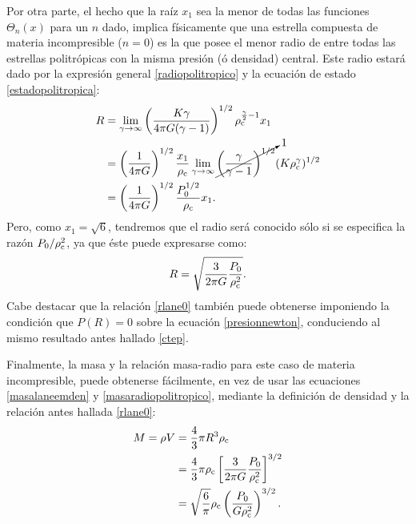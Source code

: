 \begin{itemize}
Por otra parte, el hecho que la raíz $x_1$ sea la menor de todas las funciones $\Theta_n(x)$ para un $n$ dado, implica físicamente que una estrella compuesta de materia incompresible ($n=0$) es la que posee el menor radio de entre todas las estrellas politrópicas con la misma presión (ó densidad) central. Este radio estará dado por la expresión general \eqref{radiopolitropico} y la ecuación de estado \eqref{estadopolitropica}:
\begin{align}
 R&=\lim_{\gamma\to\infty}\left(\frac{K\gamma}{4\pi G(\gamma-1)}\right)^{1/2}\rho_{\rm c}^{\frac{\gamma}{2}-1}x_1\\
 &=\left(\frac{1}{4\pi G}\right)^{1/2}\frac{x_1}{\rho_{\rm c}}\lim_{\gamma\to\infty}\cancelto{1}{\left(\frac{\gamma}{\gamma-1}\right)^{1/2}}(K\rho_{\rm c}^\gamma)^{1/2}\\
 &=\left(\frac{1}{4\pi G}\right)^{1/2}\frac{P_0^{1/2}}{\rho_{\rm c}}x_1.
\end{align}
Pero, como $x_1=\sqrt{6}$, tendremos que el radio será conocido sólo si se especifica la razón $P_0/\rho_{\rm c}^2$, ya que éste puede expresarse como:
\begin{equation}\label{rlane0}
 R=\sqrt{\frac{3}{2\pi G}\frac{P_0}{\rho_{\rm c}^2}}.
\end{equation}
Cabe destacar que la relación \eqref{rlane0} también puede obtenerse imponiendo la condición que $P(R)=0$ sobre la ecuación \eqref{presionnewton}, conduciendo al mismo resultado antes hallado \eqref{ctep}.

Finalmente, la masa y la relación masa-radio para este caso de materia incompresible, puede obtenerse fácilmente, en vez de usar las ecuaciones \eqref{masalaneemden} y \eqref{masaradiopolitropico}, mediante la definición de densidad y la relación antes hallada \eqref{rlane0}:
\begin{align}
 M=\rho V&=\frac{4}{3}\pi R^3 \rho_{\rm c}\\
 &=\frac{4}{3}\pi\rho_{\rm c} \left[\frac{3}{2\pi G}\frac{P_0}{\rho_{\rm c}^2}\right]^{3/2}\\
 &=\sqrt{\frac{6}{\pi}}\rho_{\rm c} \left(\frac{P_0}{G\rho_{\rm c}^2}\right)^{3/2}.
\end{align}



\end{itemize}
